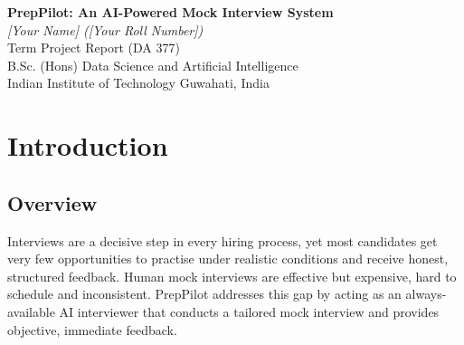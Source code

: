 \documentclass[11pt,a4paper]{article}
\begin{document}
\begin{center}
  {\LARGE \textbf{PrepPilot: An AI-Powered Mock Interview System}}\\[1.1em]
  {\large \textit{[Your Name] ([Your Roll Number])}}\\[0.45em]
  {\normalsize Term Project Report (DA 377)}\\[1.2em]
  {\normalsize B.Sc. (Hons) Data Science and Artificial Intelligence}\\[0.25em]
  {\normalsize Indian Institute of Technology Guwahati, India}
\end{center}
\vspace{1.4em}

\begin{abstract}
\noindent
\textbf{PrepPilot} is an AI-powered web application that lets a candidate practise
job interviews on demand. The user selects a target role, experience level and
interview type; an AI interviewer then asks relevant questions one at a time. The
candidate answers either by \emph{typing} or by \emph{speaking} (the voice is
transcribed automatically), and receives an \emph{instant, scored evaluation} of
every answer, including strengths, areas to improve and a model answer. At the end
of the session a consolidated performance report is produced with an overall score,
a summary and targeted preparation tips.

The system is built as a decoupled client--server application: a \textbf{FastAPI}
backend exposes a small REST API, and a \textbf{React} single-page application
provides the user interface. The intelligence is powered by a Large Language Model
(LLM) served through \textbf{Groq} for question generation, answer evaluation and
report synthesis, while \textbf{Groq Whisper} performs speech-to-text for voice
answers. The LLM layer is provider-agnostic and can be switched to Google Gemini,
OpenAI or a local Ollama model through configuration alone.
\end{abstract}

\newpage
\tableofcontents
\newpage

\section{Introduction}

\subsection{Overview}
Interviews are a decisive step in every hiring process, yet most candidates get
very few opportunities to practise under realistic conditions and receive honest,
structured feedback. Human mock interviews are effective but expensive, hard to
schedule and inconsistent. PrepPilot addresses this gap by acting as an always-available
AI interviewer that conducts a tailored mock interview and provides objective,
immediate feedback.
\end{document}
